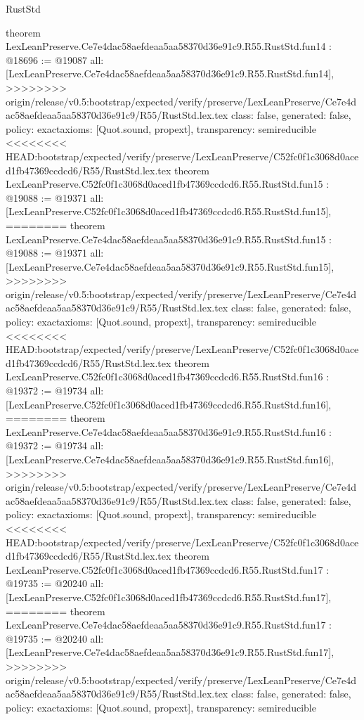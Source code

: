 \begin{lexlean}{RustStd}
\begin{coremodule}
{\begin{coremodule}
{{{{{{{{{{{{{{{{{theorem LexLeanPreserve.Ce7e4dac58aefdeaa5aa58370d36e91c9.R55.RustStd.fun14 : @18696 := @19087 {
  all: [LexLeanPreserve.Ce7e4dac58aefdeaa5aa58370d36e91c9.R55.RustStd.fun14],
>>>>>>>> origin/release/v0.5:bootstrap/expected/verify/preserve/LexLeanPreserve/Ce7e4dac58aefdeaa5aa58370d36e91c9/R55/RustStd.lex.tex
  class: false,
  generated: false,
  policy: exact{axioms: [Quot.sound, propext]},
  transparency: semireducible
}
<<<<<<<< HEAD:bootstrap/expected/verify/preserve/LexLeanPreserve/C52fc0f1c3068d0aced1fb47369ccdcd6/R55/RustStd.lex.tex
theorem LexLeanPreserve.C52fc0f1c3068d0aced1fb47369ccdcd6.R55.RustStd.fun15 : @19088 := @19371 {
  all: [LexLeanPreserve.C52fc0f1c3068d0aced1fb47369ccdcd6.R55.RustStd.fun15],
========
theorem LexLeanPreserve.Ce7e4dac58aefdeaa5aa58370d36e91c9.R55.RustStd.fun15 : @19088 := @19371 {
  all: [LexLeanPreserve.Ce7e4dac58aefdeaa5aa58370d36e91c9.R55.RustStd.fun15],
>>>>>>>> origin/release/v0.5:bootstrap/expected/verify/preserve/LexLeanPreserve/Ce7e4dac58aefdeaa5aa58370d36e91c9/R55/RustStd.lex.tex
  class: false,
  generated: false,
  policy: exact{axioms: [Quot.sound, propext]},
  transparency: semireducible
}
<<<<<<<< HEAD:bootstrap/expected/verify/preserve/LexLeanPreserve/C52fc0f1c3068d0aced1fb47369ccdcd6/R55/RustStd.lex.tex
theorem LexLeanPreserve.C52fc0f1c3068d0aced1fb47369ccdcd6.R55.RustStd.fun16 : @19372 := @19734 {
  all: [LexLeanPreserve.C52fc0f1c3068d0aced1fb47369ccdcd6.R55.RustStd.fun16],
========
theorem LexLeanPreserve.Ce7e4dac58aefdeaa5aa58370d36e91c9.R55.RustStd.fun16 : @19372 := @19734 {
  all: [LexLeanPreserve.Ce7e4dac58aefdeaa5aa58370d36e91c9.R55.RustStd.fun16],
>>>>>>>> origin/release/v0.5:bootstrap/expected/verify/preserve/LexLeanPreserve/Ce7e4dac58aefdeaa5aa58370d36e91c9/R55/RustStd.lex.tex
  class: false,
  generated: false,
  policy: exact{axioms: [Quot.sound, propext]},
  transparency: semireducible
}
<<<<<<<< HEAD:bootstrap/expected/verify/preserve/LexLeanPreserve/C52fc0f1c3068d0aced1fb47369ccdcd6/R55/RustStd.lex.tex
theorem LexLeanPreserve.C52fc0f1c3068d0aced1fb47369ccdcd6.R55.RustStd.fun17 : @19735 := @20240 {
  all: [LexLeanPreserve.C52fc0f1c3068d0aced1fb47369ccdcd6.R55.RustStd.fun17],
========
theorem LexLeanPreserve.Ce7e4dac58aefdeaa5aa58370d36e91c9.R55.RustStd.fun17 : @19735 := @20240 {
  all: [LexLeanPreserve.Ce7e4dac58aefdeaa5aa58370d36e91c9.R55.RustStd.fun17],
>>>>>>>> origin/release/v0.5:bootstrap/expected/verify/preserve/LexLeanPreserve/Ce7e4dac58aefdeaa5aa58370d36e91c9/R55/RustStd.lex.tex
  class: false,
  generated: false,
  policy: exact{axioms: [Quot.sound, propext]},
  transparency: semireducible
}}}}}}}}}}}}}}}}}}}}}
\end{coremodule}}
\end{coremodule}
\end{lexlean}
